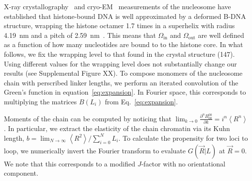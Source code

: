 \documentclass[%
 reprint,
superscriptaddress,
showpacs,preprintnumbers,
 amsmath,amssymb,
 aps,
 prl,
]{revtex4-1}
\newcommand{\greens}[2][\Omega_0; L]{G(#2|#1)}
\newcommand{\RR}{\left\langle{}R^2\right\rangle{}}
\begin{document}
X-ray crystallography~\cite{white2001,richmond2003,cutter2015a} and
    cryo-EM~\cite{bednar2017,bilokapic2018,eltsov2018,wakamori2015,zhou2015}
    measurements of the nucleosome have established that histone-bound DNA is
    well approximated by a deformed B-DNA structure, wrapping the histone
    octamer 1.7 times in a superhelix with radius \SI{4.19}{\nano\metre} and a
    pitch of \SI{2.59}{\nano\metre}~\cite{richmond2003}.
This means that $\Omega_\text{in}$ and $\Omega_\text{out}$ are well defined as a
    function of how many nucleotides are bound to to the histone core.
In what follows, we fix the wrapping level to that found in the crystal
    structure (\SI{147}{\basepair}).
Using different values for the wrapping level does not substantially change our
    results (see Supplemental Figure XX).
To compose monomers of the nucleosome chain with perscribed linker lengths, we
    perform an iterated convolution of the Green's function in
    equation~\ref{eq:expansion}.
In Fourier space, this corresponds to multiplying the matrices $B(L_i)$
    from Eq.~\ref{eq:expansion}.

Moments of the chain can be computed by noticing that
    $\lim_{k\to0} \frac{\partial^n B_{00}^{00}}{\partial k} = i^n \left\langle
    R^n\right\rangle$.
In particular, we extract the elasticity of the chain chromatin via its Kuhn
    length, $b = \lim_{N\to\infty} \RR/\sum_{i=0}^N L_i$.
To calculate the propensity for two loci to loop, we numerically invert
    the Fourier transform to evaluate $\greens[L]{\vec{R}}$ at $\vec{R} = 0$.
We note that this corresponds to a modified $J$-factor with no orientational
    component.
\end{document}
